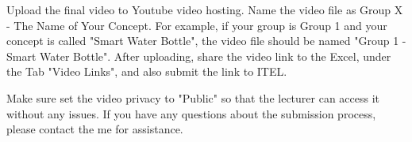 Upload the final video to Youtube video hosting. Name the video file as Group X - The Name of Your Concept. For example, if your group is Group 1 and your concept is called "Smart Water Bottle", the video file should be named "Group 1 - Smart Water Bottle". After uploading, share the video link to the Excel, under the Tab "Video Links", and also submit the link to ITEL.

Make sure set the video privacy to "Public" so that the lecturer can access it without any issues. If you have any questions about the submission process, please contact the me for assistance.




